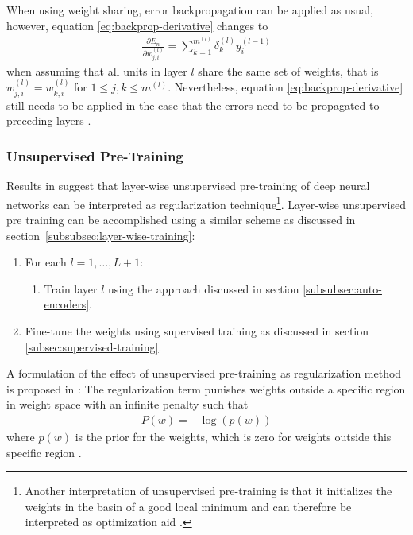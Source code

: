 When using weight sharing, error backpropagation can be applied as usual, however, equation \eqref{eq:backprop-derivative} changes to
\begin{align}
	\frac{\partial E_n}{\partial w_{j,i}^{(l)}} = \sum _{k = 1} ^{m^{(l)}} \delta_k^{(l)} y_i^{(l-1)}
\end{align}
when assuming that all units in layer $l$ share the same set of weights, that is $w_{j,i}^{(l)} = w_{k,i}^{(l)}$ for $1 \leq j,k \leq m^{(l)}$. Nevertheless, equation \eqref{eq:backprop-derivative} still needs to be applied in the case that the errors need to be propagated to preceding layers \cite{Bishop:2006}.

\subsubsection{Unsupervised Pre-Training}
\label{subsubsec:unsupervised-pretraining}

Results in \cite{ErhanBengioCourvilleManzagolVincentBengio:2010} suggest that layer-wise unsupervised pre-training of deep neural networks can be interpreted as regularization technique\footnote{Another interpretation of unsupervised pre-training is that it initializes the weights in the basin of a good local minimum and can therefore be interpreted as optimization aid \cite{Bengio:2009}.}. Layer-wise unsupervised pre training can be accomplished using a similar scheme as discussed in section~\ref{subsubsec:layer-wise-training}:
\begin{enumerate}[1.]
	\item For each $l = 1, \ldots, L+1$:
	\begin{enumerate}[--]
		\item Train layer $l$ using the approach discussed in section \ref{subsubsec:auto-encoders}.
	\end{enumerate}
	\item Fine-tune the weights using supervised training as discussed in section \ref{subsec:supervised-training}.
\end{enumerate}


A formulation of the effect of unsupervised pre-training as regularization method is proposed in \cite{ErhanManzagolBengioVincent:2009}: The regularization term punishes weights outside a specific region in weight space with an infinite penalty such that
\begin{align}
	P(w) = - \log(p(w))
\end{align}
where $p(w)$ is the prior for the weights, which is zero for weights outside this specific region \cite{ErhanBengioCourvilleManzagolVincentBengio:2010}.

